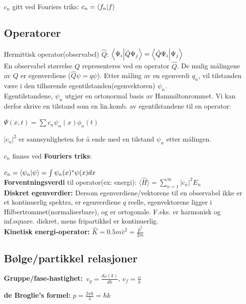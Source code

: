 \documentclass[10p,a4paper]{extarticle}
\begin{document}
\begin{multicols}{2}
$c_n$ gitt ved Fouriers triks: $c_n = \bra{f_n}\ket{f}$

\subsection*{Operatorer}
Hermittisk operator(observabel) $\hat{Q}$: $\bra{\Psi_i}\ket{\hat{Q}\Psi_j} = \bra{\hat{Q}\Psi_i}\ket{\Psi_j}$
\\

En observabel størrelse $Q$ representeres ved en operator $\hat{Q}$. De mulig målingene av $Q$ er egenverdiene ($\hat{Q}\psi = q\psi$). Etter måling av en egenverdi $q_n$, vil tilstanden være i den tilhørende egentilstanden(egenvektoren) $\psi_n$.
\\

Egentilstandene, $\psi_n$ utgjør en ortonormal basis av Hammiltonrommet. Vi kan derfor skrive en tilstand som en lin.komb. av egentilstandene til en operator:

$\Psi(x,t) = \sum c_n \psi_n(x) \phi_n(t)$

$|c_n|^2$ er sannsynligheten for å ende med en tilstand $\psi_n$ etter målingen.

$c_n$ finnes ved \textbf{Fouriers triks}:

$c_n = \bra{\psi_n}\ket{\psi} = \int \psi_n(x)^* \psi(x) dx$
\\

\textbf{Forventningsverdi} til operator(ex: energi): $\langle \hat{H} \rangle = \sum\limits_{n=1}^\infty |c_n|^2E_n$
\\

\textbf{Diskret egenverdier:} Dersom egenverdiene/vektorene til en observabel ikke er et kontinuerlig spektra, er egenverdiene $q$ reelle, egenvektorene ligger i Hilbertrommet(normaliserbare), og er ortogonale. F.eks. er harmonisk og inf.square. diskret, mens fripartikkel er kontinuerlig.
\\

\textbf{Kinetisk energi-operator:} $\hat{K} = 0.5m\hat{v}^2 = \frac{\hat{p}^2}{2m}$


\columnbreak


\subsection*{Bølge/partikkel relasjoner}

\textbf{Gruppe/fase-hastighet:} $v_g = \frac{d\omega(k)}{dk}$, $v_f = \frac{\omega}{k}$

\textbf{de Broglie's formel:} $p = \frac{2\pi\hbar}{\lambda} = \hbar k$


\end{multicols}
\end{document}
